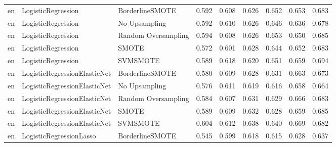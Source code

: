 \begin{tabular}{lllllllll}
      en &           LogisticRegression &     BorderlineSMOTE & 0.592 &                     0.608 &                 0.626 &                  0.652 &                                   0.653 &     0.683 \\
      en &           LogisticRegression &       No Upsampling & 0.592 &                     0.610 &                 0.626 &                  0.646 &                                   0.636 &     0.678 \\
      en &           LogisticRegression & Random Oversampling & 0.594 &                     0.608 &                 0.626 &                  0.653 &                                   0.650 &     0.685 \\
      en &           LogisticRegression &               SMOTE & 0.572 &                     0.601 &                 0.628 &                  0.644 &                                   0.652 &     0.683 \\
      en &           LogisticRegression &            SVMSMOTE & 0.589 &                     0.618 &                 0.620 &                  0.651 &                                   0.659 &     0.694 \\
      en & LogisticRegressionElasticNet &     BorderlineSMOTE & 0.580 &                     0.609 &                 0.628 &                  0.631 &                                   0.663 &     0.673 \\
      en & LogisticRegressionElasticNet &       No Upsampling & 0.576 &                     0.611 &                 0.619 &                  0.616 &                                   0.658 &     0.664 \\
      en & LogisticRegressionElasticNet & Random Oversampling & 0.584 &                     0.607 &                 0.631 &                  0.629 &                                   0.666 &     0.683 \\
      en & LogisticRegressionElasticNet &               SMOTE & 0.589 &                     0.609 &                 0.632 &                  0.628 &                                   0.659 &     0.685 \\
      en & LogisticRegressionElasticNet &            SVMSMOTE & 0.604 &                     0.612 &                 0.638 &                  0.640 &                                   0.669 &     0.682 \\
      en &      LogisticRegressionLasso &     BorderlineSMOTE & 0.545 &                     0.599 &                 0.618 &                  0.615 &                                   0.628 &     0.637 \\

\end{tabular}
